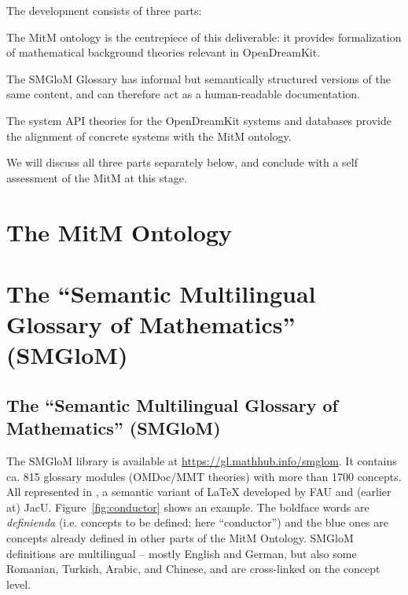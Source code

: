 \documentclass{deliverablereport}
\begin{document}
The development consists of three parts:
\begin{compactenum}[\em i\rm)]
\item The MitM ontology is the centrepiece of this deliverable: it provides formalization of mathematical background theories relevant in OpenDreamKit.
\item The SMGloM Glossary has informal but semantically structured versions of the same content, and can therefore act as a human-readable documentation.
\item The system API theories for the OpenDreamKit systems and databases provide the alignment of concrete systems with the MitM ontology.
\end{compactenum}
We will discuss all three parts separately below, and conclude with a
self assessment of the MitM at this stage.

\section{The MitM Ontology}\label{sec:mitmonto}


\section{The ``Semantic Multilingual Glossary of Mathematics'' (SMGloM)}\label{sec:smglom}

\subsection{The ``Semantic Multilingual Glossary of Mathematics'' (SMGloM)}\label{sec:smglom}

The SMGloM library is available at \url{https://gl.mathhub.info/smglom}. It contains
ca. 815 glossary modules (OMDoc/MMT theories) with more than 1700 concepts. All
represented in \sTeX, a semantic variant of {\LaTeX} developed by FAU and (earlier at)
JacU. Figure~\ref{fig:conductor} shows an example. The boldface words are \emph{definienda}
(i.e. concepts to be defined; here ``conductor'') and the blue ones are concepts already
defined in other parts of the MitM Ontology. SMGloM definitions are multilingual -- mostly
English and German, but also some Romanian, Turkish, Arabic, and Chinese, and are
cross-linked on the concept level.

\end{document}
